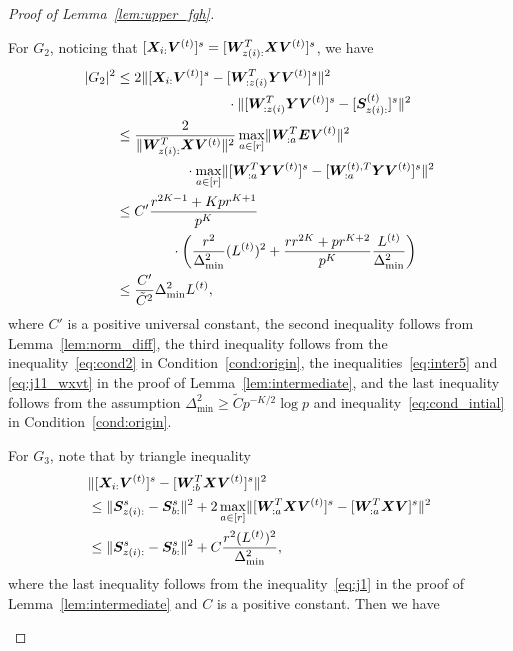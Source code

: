 \documentclass[journal]{IEEEtran}
\theoremstyle{definition}
\theoremstyle{definition}
\newcommand{\of}[1]{\left(#1\right)}
\begin{document}
\begin{proof}[Proof of Lemma~\ref{lem:upper_fgh}]
\begin{enumerate}[wide]
    For $G_2$, noticing that $[\bm X_{i:} \bm{V}^{(t)}]^s = [ \bm{W}_{z(i):}^T\bm X \bm{V}^{(t)}]^s$, we have 
    \begin{align}
        |G_2|^2 &\leq 2\onormSize{}{ [\mX_{i:} \mV^{(t)}]^s  -  [  \mW_{:z(i)}^T \mY \mV^{(t)} ]^s}^2 \\
        & \quad \quad \quad \quad \quad  \quad \quad \quad \cdot \onormSize{}{ [  \mW_{:z(i)}^T \mY \mV^{(t)} ]^s -  [  \mS_{z(i):}^{(t)}  ]^s }^2 \\
        & \leq \frac{2}{ \onormSize{}{ \mW_{z(i):}^T\mX \mV^{(t)}}^2} \max_{a \in [r]}\onormSize{}{ \mW_{:a}^T \mE \mV^{(t)} }^2 \\
        & \quad \quad \quad \quad  \quad \cdot \max_{a \in [r]} \onormSize{}{ [  \mW_{:a}^T \mY \mV^{(t)} ]^s -  [   \mW_{:a}^{(t),T} \mY \mV^{(t)}  ]^s}^2\\
        & \leq C' \frac{ r^{2K-1} + K p r^{K+1} }{p^{K}} \\
        &  \quad \quad \quad  \quad  \cdot \of{ \frac{r^2}{\Delta_{\min}^2} (L^{(t)})^2 + \frac{r r^{2K} + pr^{K+2}}{p^{K}} \frac{L^{(t)}}{\Delta_{\min}^2} }\\
        & \leq \frac{C'}{\tilde C^2} \Delta_{\min}^2 L^{(t)},\label{eq:g2}
    \end{align}
    where $C'$ is a positive universal constant, the second inequality follows from Lemma~\ref{lem:norm_diff}, the third inequality follows from the inequality~\eqref{eq:cond2} in Condition~\ref{cond:origin}, the inequalities~\eqref{eq:inter5} and \eqref{eq:j11_wxvt} in the proof of Lemma~\ref{lem:intermediate},  and the last inequality follows from the assumption $\Delta_{\min}^2 \geq \tilde C p^{-K/2} \log p$ and inequality~\eqref{eq:cond_intial} in Condition~\ref{cond:origin}.
    
    For $G_3$, note that by triangle inequality
    \begin{align}
        &\onormSize{}{[\mX_{i:} \mV^{(t)}]^s  -  [  \mW_{:b}^T \mX \mV^{(t)} ]^s}^2 \\& \leq \onormSize{}{\mS_{z(i):}^s - \mS_{b:}^s}^2 + 2\max_{a \in [r]}\onormSize{}{[\mW_{:a}^T\mX \mV^{(t)}]^s - [\mW_{:a}^T\mX \mV]^s }^2\\
        & \leq \onormSize{}{\mS_{z(i):}^s - \mS_{b:}^s}^2 + C \frac{r^2 (L^{(t)})^2}{\Delta_{\min}^2}, \label{eq:g3xv_wxv}
    \end{align}
    where the last inequality follows from the inequality~\eqref{eq:j1} in the proof of Lemma~\ref{lem:intermediate} and $C$ is a positive constant.
   Then we have 
   

\end{enumerate}
\end{proof}
\end{document}
